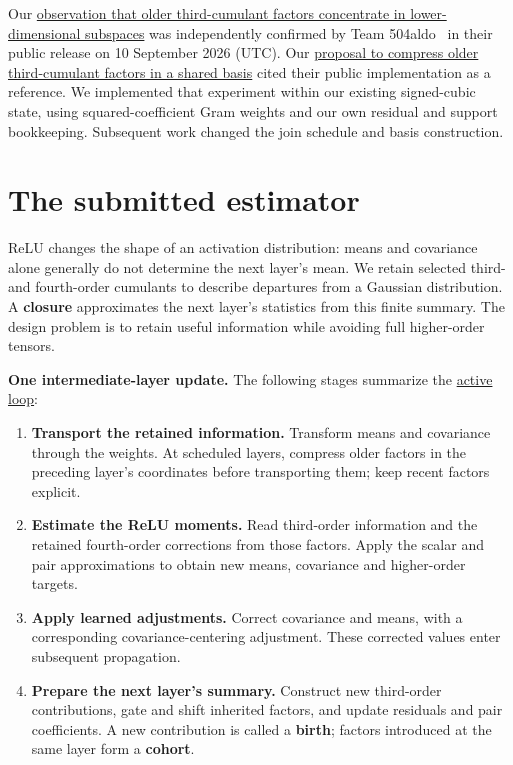 \documentclass[11pt,letterpaper]{article}
\providecommand{\tightlist}{\setlength{\itemsep}{0pt}\setlength{\parskip}{0pt}}
\begin{document}
Our \href{https://github.com/mattliston/arc-whitebox-estimation-challenge/tree/main/records/research/2026-09-03-third-cumulant-source-cohort-spectra-suggested-age-dependent-factor/}{observation that older third-cumulant factors concentrate in lower-dimensional subspaces} was independently confirmed by Team 504aldo~\cite{ref-504aldo} in their public release on 10 September 2026 (UTC). Our \href{https://github.com/mattliston/arc-whitebox-estimation-challenge/blob/main/records/research/2026-09-12-shared-rank-384-basis-cubic-cohorts-older-than-four/PROTOCOL.md\#L203}{proposal to compress older third-cumulant factors in a shared basis} cited their public implementation as a reference. We implemented that experiment within our existing signed-cubic state, using squared-coefficient Gram weights and our own residual and support bookkeeping. Subsequent work changed the join schedule and basis construction.

\section{The submitted estimator}\label{the-submitted-estimator}

ReLU changes the shape of an activation distribution: means and covariance alone generally do not determine the next layer's mean. We retain selected third- and fourth-order cumulants to describe departures from a Gaussian distribution. A \textbf{closure} approximates the next layer's statistics from this finite summary. The design problem is to retain useful information while avoiding full higher-order tensors.

\textbf{One intermediate-layer update.} The following stages summarize the \href{https://github.com/mattliston/arc-whitebox-estimation-challenge/blob/main/submissions/337641/estimator.py\#L24632}{active loop}:

\begin{enumerate}
\def\labelenumi{\arabic{enumi}.}
\tightlist
\item
  \textbf{Transport the retained information.} Transform means and covariance through the weights. At scheduled layers, compress older factors in the preceding layer's coordinates before transporting them; keep recent factors explicit.
\item
  \textbf{Estimate the ReLU moments.} Read third-order information and the retained fourth-order corrections from those factors. Apply the scalar and pair approximations to obtain new means, covariance and higher-order targets.
\item
  \textbf{Apply learned adjustments.} Correct covariance and means, with a corresponding covariance-centering adjustment. These corrected values enter subsequent propagation.
\item
  \textbf{Prepare the next layer's summary.} Construct new third-order contributions, gate and shift inherited factors, and update residuals and pair coefficients. A new contribution is called a \textbf{birth}; factors introduced at the same layer form a \textbf{cohort}.
\end{enumerate}
\end{document}
